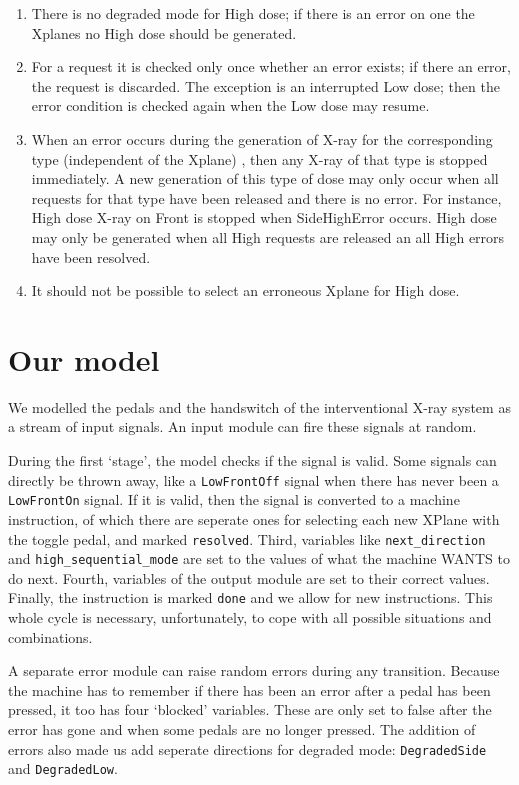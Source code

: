 \documentclass[a4paper,10pt]{article}
\begin{document}
\begin{enumerate}
\begin{enumerate}
			\end{enumerate}
		\item There is no degraded mode for High dose; if there is an error on one the Xplanes no High dose should be generated.
		\item For a request it is checked only once whether an error exists; if there an error, the request is discarded. The exception is an interrupted Low dose; then the error condition is checked again when the Low dose may resume.
		\item When an error occurs during the generation of X-ray for the corresponding type (independent of the Xplane) , then any X-ray of that type is stopped immediately. A new generation of this type of dose may only occur when all requests for that type have been released and there is no error. For instance, High dose X-ray on Front is stopped when SideHighError occurs. High dose may only be generated when all High requests are released an all High errors have been resolved.
		\item It should not be possible to select an erroneous Xplane for High dose.
	\end{enumerate}
	
	\section{Our model}
	We modelled the pedals and the handswitch of the interventional X-ray system as a stream of input signals. An input module can fire these signals at random.
	
	During the first `stage', the model checks if the signal is valid. Some signals can directly be thrown away, like a \texttt{LowFrontOff} signal when there has never been a \texttt{LowFrontOn} signal. If it is valid, then the signal is converted to a machine instruction, of which there are seperate ones for selecting each new XPlane with the toggle pedal, and marked \texttt{resolved}. Third, variables like \texttt{next\_direction} and \texttt{high\_sequential\_mode} are set to the values of what the machine WANTS to do next. Fourth, variables of the output module are set to their correct values. Finally, the instruction is marked \texttt{done} and we allow for new instructions. This whole cycle is necessary, unfortunately, to cope with all possible situations and combinations.
	
	A separate error module can raise random errors during any transition. Because the machine has to remember if there has been an error after a pedal has been pressed, it too has four `blocked' variables. These are only set to false after the error has gone and when some pedals are no longer pressed. The addition of errors also made us add seperate directions for degraded mode: \texttt{DegradedSide} and \texttt{DegradedLow}.
	
\end{document}
